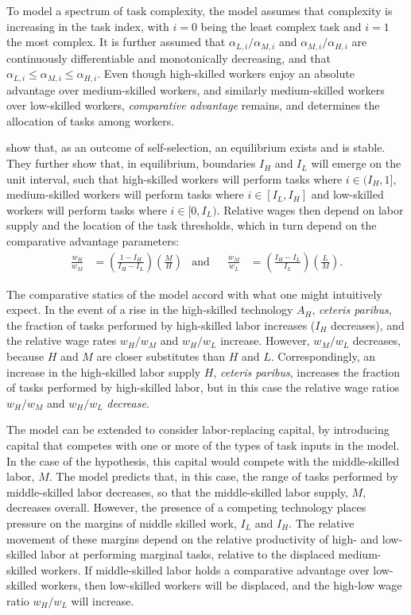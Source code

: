 To model a spectrum of task complexity, the model assumes that complexity is increasing in the task index, with $i=0$ being the least complex task and $i=1$ the most complex. It is further assumed that $\alpha_{L,i}/\alpha_{M,i}$ and  $\alpha_{M,i}/\alpha_{H,i}$ are
continuously differentiable and monotonically decreasing, and that ${\alpha_{L,i} \leq \alpha_{M,i} \leq \alpha_{H,i}.}$
Even though high-skilled workers enjoy an absolute advantage over medium-skilled workers, and similarly medium-skilled workers over low-skilled workers, {\em comparative advantage} remains, and determines the allocation of tasks among workers.

\citet{Acemoglu2011} show that, as an outcome of self-selection, an equilibrium exists and is stable. They further show that, in equilibrium, boundaries $I_H$ and $I_L$ will emerge on the unit interval, such that high-skilled workers will perform tasks where $i \in (I_H,1]$, medium-skilled workers will perform tasks where $i \in [I_L, I_H]$ and low-skilled workers will perform tasks where $i \in [0, I_L)$. Relative wages then depend on labor supply and the location of the task thresholds, which in turn depend on the comparative advantage parameters:
\begin{align*}
  \frac{w_H}{w_M} &= \left( \frac{1-I_H}{I_H - I_L} \right)\left(\frac{M}{H}\right) & \text{and} &&
  \frac{w_M}{w_L} &= \left( \frac{I_H-I_L}{I_L} \right)\left(\frac{L}{M}\right).
\end{align*}

The comparative statics of the model accord with what one might intuitively expect. In the event of a rise in the high-skilled technology $A_H$, {\em ceteris paribus}, the fraction of tasks performed by high-skilled labor increases ($I_H$ decreases), and the relative wage rates $w_H/w_M$ and $w_H/w_L$ increase. However, $w_M/w_L$ decreases, because $H$ and $M$ are closer substitutes than $H$ and $L$. Correspondingly, an increase in the high-skilled labor supply $H$, {\em ceteris paribus}, increases the fraction of tasks performed by high-skilled labor, but in this case the relative wage ratios $w_H/w_M$ and $w_H/w_L$ {\em decrease}.

The model can be extended to consider labor-replacing capital, by introducing capital that competes with one or more of the types of task inputs in the model. In the case of the \citet{Levy2003} hypothesis, this capital would compete with the middle-skilled labor, $M$. The model predicts that, in this case, the range of tasks performed by middle-skilled labor decreases, so that the middle-skilled labor supply, $M$, decreases overall. However, the presence of a competing technology places pressure on the margins of middle skilled work, $I_L$ and $I_H$. The relative movement of these margins depend on the relative productivity of high- and low-skilled labor at performing marginal tasks, relative to the displaced medium-skilled workers. If middle-skilled labor holds a comparative advantage over low-skilled workers, then low-skilled workers will be displaced, and the high-low wage ratio $w_H/w_L$ will increase.

